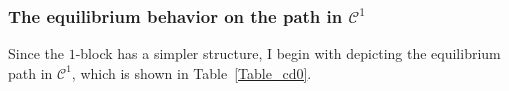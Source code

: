 \documentclass[12pt,letter]{article}
\newcommand{\Kappa}{\mathcal{C}}
\theoremstyle{definition}
\theoremstyle{remark}
\theoremstyle{claim}
\begin{document}
\subsubsection{The equilibrium behavior on the path in $\Kappa^1$}
Since the $1$-block has a simpler structure, I begin with depicting the equilibrium path in $\Kappa^1$, which is shown in Table~\ref{Table_cd0}. 
%
%
%
%    
%    
%        
\end{document}

